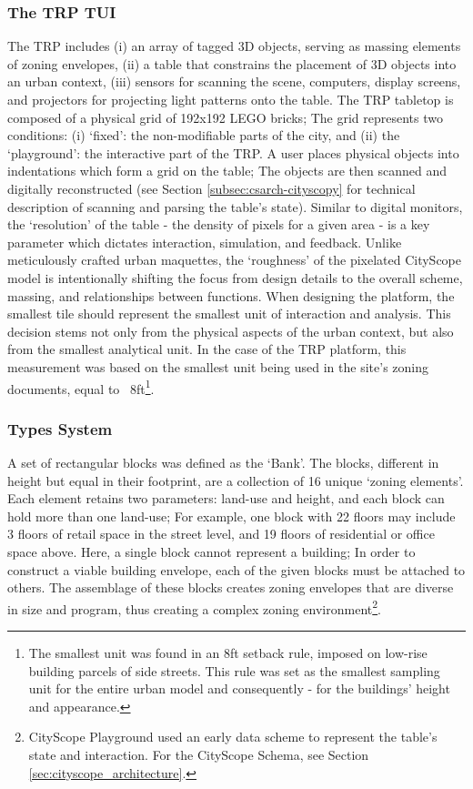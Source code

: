 {    \subsubsection{The TRP TUI}
    {
        The TRP includes (i) an array of tagged 3D objects, serving as massing elements of zoning envelopes, (ii) a table that constrains the placement of 3D objects into an urban context, (iii) sensors for scanning the scene, computers, display screens, and projectors for projecting light patterns onto the table. The TRP tabletop is composed of a physical grid of 192x192 LEGO bricks; The grid represents two conditions: (i) `fixed': the non-modifiable parts of the city, and (ii) the `playground': the interactive part of the TRP. A user places physical objects into indentations which form a grid on the table; The objects are then scanned and digitally reconstructed (see Section \eqref{subsec:csarch-cityscopy} for technical description of scanning and parsing the table's state).
        \newline
        Similar to digital monitors, the `resolution' of the table - the density of pixels for a given area - is a key parameter which dictates interaction, simulation, and feedback. Unlike meticulously crafted urban maquettes, the `roughness' of the pixelated CityScope model is intentionally shifting the focus from design details to the overall scheme, massing, and relationships between functions.
        When designing the platform, the smallest tile should represent the smallest unit of interaction and analysis. This decision stems not only from the physical aspects of the urban context, but also from the smallest analytical unit. In the case of the TRP platform, this measurement was based on the smallest unit being used in the site's zoning documents, equal to ~8ft\footnote{The smallest unit was found in an 8ft setback rule, imposed on low-rise building parcels of side streets. This rule was set as the smallest sampling unit for the entire urban model and consequently - for the buildings' height and appearance.}.
    }

    \subsubsection{Types System}\label{subsec:playground_types_system}

    {
        A set of rectangular blocks was defined as the `Bank'. The blocks, different in height but equal in their footprint, are a collection of 16 unique `zoning elements'. Each element retains two parameters: land-use and height, and each block can hold more than one land-use; For example, one block with 22 floors may include 3 floors of retail space in the street level, and 19 floors of residential or office space above. Here, a single block cannot represent a building; In order to construct a viable building envelope, each of the given blocks must be attached to others. The assemblage of these blocks creates zoning envelopes that are diverse in size and program, thus creating a complex zoning environment\footnote{CityScope Playground used an early data scheme to represent the table's state and interaction. For the CityScope Schema, see Section \eqref{sec:cityscope_architecture}.}.
    }

}
